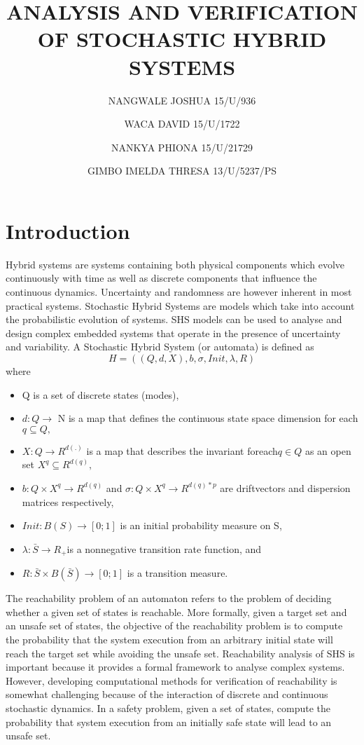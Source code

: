 \documentclass{article}
\begin{document}
\title{ANALYSIS AND VERIFICATION OF STOCHASTIC HYBRID SYSTEMS}
\author{NANGWALE JOSHUA 15/U/936}
\author{WACA DAVID  15/U/1722}
\author{NANKYA PHIONA 15/U/21729}
\author{GIMBO IMELDA THRESA 13/U/5237/PS}

\maketitle

\section{Introduction}
Hybrid systems are systems containing both physical components which evolve continuously with time as well as discrete components that influence the continuous dynamics. Uncertainty and randomness are however inherent in most practical systems.  Stochastic Hybrid Systems are models which take into account the probabilistic evolution of systems. SHS models can be used to analyse and design complex embedded systems that operate in the presence of uncertainty and variability. A Stochastic Hybrid System (or automata) is defined as $$ H=((Q,d,X),b,\sigma,Init,\lambda,R)$$ where
\begin{itemize}
\item Q is a set of discrete states (modes),
\item $d : Q \rightarrow$ N is a map that defines the continuous state space dimension for each $q \subseteq Q,$
\item $X : Q \rightarrow R^{d(.)}$ is a map that describes the invariant foreach$ q \in Q$ as an open set $X^q \subseteq R^{d(q)},$
 \item $b : Q \times X^q \rightarrow R^{d(q)}$ and $ \sigma : Q \times X^q \rightarrow R^{d(q)*p}$ are driftvectors and dispersion matrices respectively,
\item $ Init : B(S) \rightarrow [0; 1]$ is an initial probability measure on S,
\item $\lambda : \bar{S} \rightarrow R_{+} $is a nonnegative transition rate function, and
\item $ R : \bar{S} \times B(\bar{S}) \rightarrow [0; 1]$ is a transition measure.
\end{itemize}
The reachability problem of an automaton refers to the problem of deciding whether a given set of states is reachable. More formally, given a target set and an unsafe set of states, the objective  of the reachability problem is to compute the probability that the system execution from an arbitrary initial state will reach the target set while avoiding the unsafe set. Reachability analysis of SHS is important because it provides a formal framework to analyse complex systems. However, developing computational methods for verification of reachability is somewhat challenging because of the interaction of discrete and continuous stochastic dynamics.
In a safety problem, given a set of states, compute the probability that system execution from an initially safe state will lead to an unsafe set.
\end{document}
